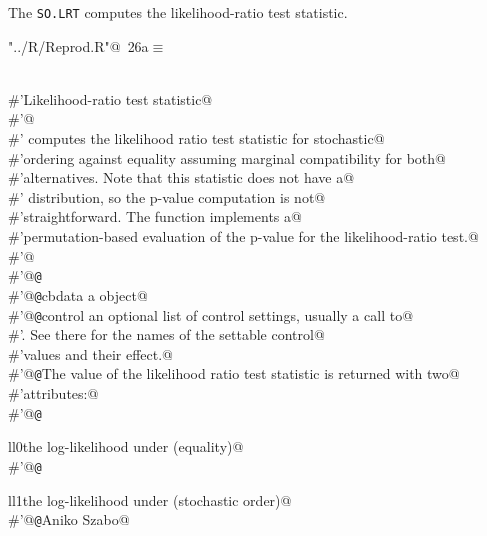 \documentclass[reqno]{amsart}
\renewcommand{\NWtarget}[2]{\hypertarget{#1}{#2}}
\begin{document}
The \texttt{SO.LRT} computes the likelihood-ratio test statistic.
\begin{flushleft} \small\label{scrap36}\raggedright\small
\NWtarget{nuweb26a}{} \verb@"../R/Reprod.R"@\nobreak\ {\footnotesize {26a}}$\equiv$
\vspace{-1ex}
\begin{list}{}{} \item
\mbox{}\verb@@\\
\mbox{}\verb@#'Likelihood-ratio test statistic@\\
\mbox{}\verb@#'@\\
\mbox{}\verb@#' computes the likelihood ratio test statistic for stochastic@\\
\mbox{}\verb@#'ordering against equality assuming marginal compatibility for both@\\
\mbox{}\verb@#'alternatives. Note that this statistic does not have a@\\
\mbox{}\verb@#' distribution, so the p-value computation is not@\\
\mbox{}\verb@#'straightforward. The  function implements a@\\
\mbox{}\verb@#'permutation-based evaluation of the p-value for the likelihood-ratio test.@\\
\mbox{}\verb@#'@\\
\mbox{}\verb@#'@{\tt @}\verb@export@\\
\mbox{}\verb@#'@{\tt @}\verb@param cbdata a  object@\\
\mbox{}\verb@#'@{\tt @}\verb@param control an optional list of control settings, usually a call to@\\
\mbox{}\verb@#'.  See there for the names of the settable control@\\
\mbox{}\verb@#'values and their effect.@\\
\mbox{}\verb@#'@{\tt @}\verb@return The value of the likelihood ratio test statistic is returned with two@\\
\mbox{}\verb@#'attributes:@\\
\mbox{}\verb@#'@{\tt @}\verb@return \item{ll0}{the log-likelihood under  (equality)}@\\
\mbox{}\verb@#'@{\tt @}\verb@return \item{ll1}{the log-likelihood under  (stochastic order)}@\\
\mbox{}\verb@#'@{\tt @}\verb@author Aniko Szabo@\\

\end{list}
\end{flushleft}
\end{document}
